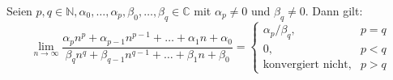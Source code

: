 Seien $p, q \in \mathbb{N}, \alpha_0, \dots, \alpha_p, \beta_0, \dots, \beta_q \in \mathbb{C}$ mit $\alpha_p \neq 0$ und $\beta_q \neq 0$. Dann gilt: 
$$
\lim_{n \to \infty}
\frac{\alpha_p n^p + \alpha_{p-1} n^{p-1} + \dots + \alpha_1 n + \alpha_0}
{\beta_q n^q + \beta_{q-1} n^{q-1} + \dots + \beta_1 n + \beta_0}
= \begin{cases}
\alpha_p / \beta_q, & p = q \\
0, & p < q \\
\text{konvergiert nicht}, & p > q
\end{cases}
$$